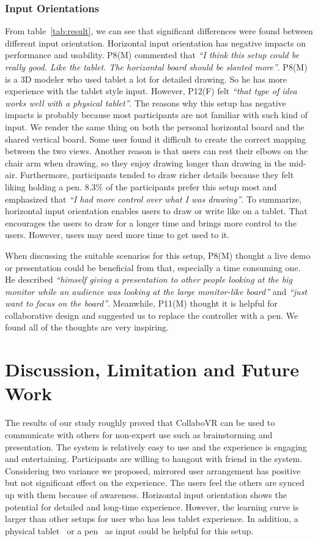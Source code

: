 \documentclass{sigchi}
\begin{document}
\subsubsection{Input Orientations}
From table~\ref{tab:result}, we can see that significant differences were found between different input orientation. Horizontal input orientation has negative impacts on performance and usability. P8(M) commented that \textit{``I think this setup could be really good. Like the tablet. The horizontal board should be slanted more''}. P8(M) is a 3D modeler who used tablet a lot for detailed drawing. So he has more experience with the tablet style input. However, P12(F) felt \textit{``that type of idea works well with a physical tablet''}. The reasons why this setup has negative impacts is probably because most participants are not familiar with such kind of input. We render the same thing on both the personal horizontal board and the shared vertical board. Some user found it difficult to create the correct mapping between the two views. Another reason is that users can rest their elbows on the chair arm when drawing, so they enjoy drawing longer than drawing in the mid-air. Furthermore, participants tended to draw richer details because they felt liking holding a pen. 8.3\% of the participants prefer this setup most and emphasized that \textit{``I had more control over what I was drawing''}. To summarize, horizontal input orientation enables users to draw or write like on a tablet. That encourages the users to draw for a longer time and brings more control to the users. However, users may need more time to get used to it.

When discussing the suitable scenarios for this setup, P8(M) thought a live demo or presentation could be beneficial from that, especially a time consuming one. He described \textit{``himself giving a presentation to other people looking at the big monitor while an audience was looking at the large monitor-like board''} and \textit{``just want to focus on the board''}. Meanwhile, P11(M) thought it is helpful for collaborative design and suggested us to replace the controller with a pen. We found all of the thoughts are very inspiring.

\section{Discussion, Limitation and Future Work}
The results of our study roughly proved that CollaboVR can be used to communicate with others for non-expert use such as brainstorming and presentation. The system is relatively easy to use and the experience is engaging and entertaining. Participants are willing to hangout with friend in the system. Considering two variance we proposed, mirrored user arrangement has positive but not significant effect on the experience. The users feel the others are synced up with them because of awareness. Horizontal input orientation shows the potential for detailed and long-time experience. However, the learning curve is larger than other setups for user who has less tablet experience. In addition, a physical tablet~\cite{sensel} or a pen~\cite{wu2017dodecapen} as input could be helpful for this setup. 
\end{document}

